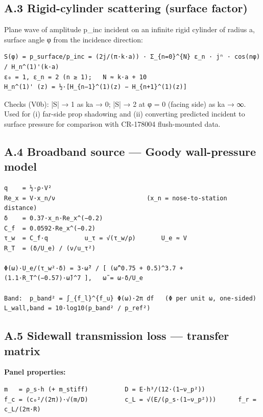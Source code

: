 \documentclass[10pt,a4paper]{article}
\begin{document}
\subsection*{A.3 Rigid-cylinder scattering (surface factor)}

Plane wave of amplitude p\_inc incident on an infinite rigid cylinder of radius a, surface angle φ from the incidence direction:

\begin{Verbatim}[breaklines,fontsize=\small,frame=single,rulecolor=\color{gray}]
S(φ) = p_surface/p_inc = (2j/(π·k·a)) · Σ_{n=0}^{N} ε_n · jⁿ · cos(nφ) / H_n^(1)'(k·a)
ε₀ = 1, ε_n = 2 (n ≥ 1);   N ≈ k·a + 10
H_n^(1)' (z) = ½·[H_{n−1}^(1)(z) − H_{n+1}^(1)(z)]
\end{Verbatim}

Checks (V0b): |S| → 1 as ka → 0; |S| → 2 at φ = 0 (facing side) as ka → ∞. Used for (i) far-side prop shadowing and (ii) converting predicted incident to surface pressure for comparison with CR-178004 flush-mounted data.

\subsection*{A.4 Broadband source — Goody wall-pressure model}

\begin{Verbatim}[breaklines,fontsize=\small,frame=single,rulecolor=\color{gray}]
q    = ½·ρ·V²
Re_x = V·x_n/ν                         (x_n = nose-to-station distance)
δ    = 0.37·x_n·Re_x^(−0.2)
C_f  = 0.0592·Re_x^(−0.2)
τ_w  = C_f·q          u_τ = √(τ_w/ρ)       U_e ≈ V
R_T  = (δ/U_e) / (ν/u_τ²)

Φ(ω)·U_e/(τ_w²·δ) = 3·ω̃² / [ (ω̃^0.75 + 0.5)^3.7 + (1.1·R_T^(−0.57)·ω̃)^7 ],   ω̃ = ω·δ/U_e

Band:  p_band² = ∫_{f_l}^{f_u} Φ(ω)·2π df   (Φ per unit ω, one-sided)
L_wall,band = 10·log10(p_band² / p_ref²)
\end{Verbatim}

\subsection*{A.5 Sidewall transmission loss — transfer matrix}

\textbf{Panel properties:}

\begin{Verbatim}[breaklines,fontsize=\small,frame=single,rulecolor=\color{gray}]
m   = ρ_s·h (+ m_stiff)          D = E·h³/(12·(1−ν_p²))
f_c = (c₀²/(2π))·√(m/D)          c_L = √(E/(ρ_s·(1−ν_p²)))      f_r = c_L/(2π·R)
\end{Verbatim}
\end{document}

